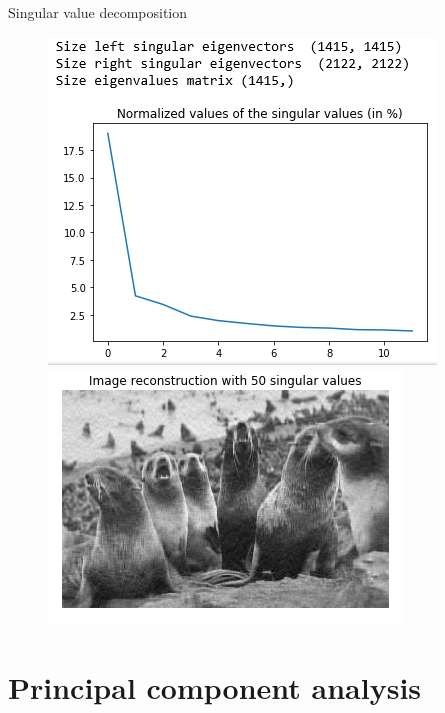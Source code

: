 \documentclass[9pt]{beamer}
\begin{document}
\begin{frame}{Singular value decomposition}
\begin{figure}
\begin{center}
\includegraphics[scale = .35]{./svd_python_out1.png}
\includegraphics[scale = .35]{./svd_python_out2.png}
\end{center}
\end{figure}
\end{frame}

\section{Principal component analysis}
\end{document}
